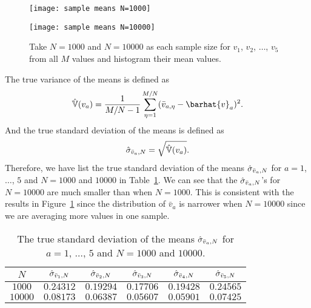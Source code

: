 \begin{figure}
    \centering
    \begin{minipage}[t]{0.8\linewidth}
        \centering
        \texttt{[image: sample means N=1000]}
        \label{fig:hist_mean:a}
    \end{minipage}
    \hfill
    \begin{minipage}[t]{0.8\linewidth}
        \centering
        \texttt{[image: sample means N=10000]}
        \label{fig:hist_mean:b}
    \end{minipage}
    \caption{Take \(N = 1000\) and \(N = 10000\) as each sample size
        for \(v_1\), \(v_2\), \(\ldots\), \(v_5\) from all \(M\) values
        and histogram their mean values.}
    \label{fig:hist_mean}
\end{figure}

The true variance of the means is defined as
%
\begin{equation}\label{eq:varva}
    \hat{\mathbb{V}}(v_a) = \frac{ 1 }{ M/N - 1 }
    \sum_{\eta=1}^{M/N} (\bar{v}_{a,\eta} - \barhat{v}_a)^2.
\end{equation}
%
And the true standard deviation of the means is defined as
%
\begin{equation}
    \hat{\sigma}_{\bar{v}_a,N} = \sqrt{\hat{\mathbb{V}}(v_a)}.
\end{equation}
%
Therefore, we have list the true standard deviation of the means
\(\hat{\sigma}_{\bar{v}_a,N}\) for \(a = 1\), \(\ldots\), \(5\) and \(N = 1000\) and \(10000\)
in Table~\ref{tab:truestd}.
We can see that the \(\hat{\sigma}_{\bar{v}_a,N}\)'s for \(N = 10000\) are much smaller than
when \(N = 1000\). This is consistent with the results in Figure~\ref{fig:hist_mean}
since the distribution of \(\bar{v}_a\) is narrower when \(N = 10000\) since
we are averaging more values in one sample.

\begin{table}[H]
    \centering
    \caption{The true standard deviation of the means
        \(\hat{\sigma}_{\bar{v}_a,N}\) for \(a = 1\), \(\ldots\), \(5\) and \(N = 1000\) and \(10000\).}
    \label{tab:truestd}
    \begin{tabular}{@{}cccccc@{}}
        \toprule
        \(N\)     & \(\hat{\sigma}_{\bar{v}_1,N}\) & \(\hat{\sigma}_{\bar{v}_2,N}\) & \(\hat{\sigma}_{\bar{v}_3,N}\) & \(\hat{\sigma}_{\bar{v}_4,N}\) & \(\hat{\sigma}_{\bar{v}_5,N}\) \\
        \midrule
        \(1000\)  & \(0.24312\)   & \(0.19294\)   & \(0.17706\)   & \(0.19428\)   & \(0.24565\)   \\
        \(10000\) & \(0.08173\)   & \(0.06387\)   & \(0.05607\)   & \(0.05901\)   & \(0.07425\)   \\
        \bottomrule
    \end{tabular}
\end{table}


